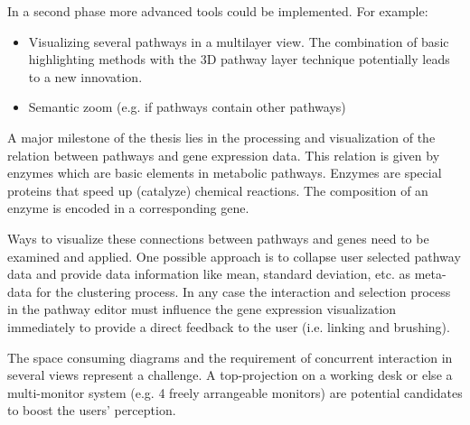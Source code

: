In a second phase more advanced tools could be implemented. 
For example:
\begin{itemize}
\item Visualizing several pathways in a multilayer view. The combination of basic highlighting methods with the 3D pathway layer technique potentially leads to a new innovation.
\item Semantic zoom (e.g. if pathways contain other pathways)
\end{itemize}


A major milestone of the thesis lies in the processing and visualization of the relation between pathways and gene expression data. This relation is given by enzymes which are basic elements in metabolic pathways. Enzymes are special proteins that speed up (catalyze) chemical reactions. The composition of an enzyme is encoded in a corresponding gene.

Ways to visualize these connections between pathways and genes need to be examined and applied. One possible approach is to collapse user selected pathway data and provide data information like mean, standard deviation, etc. as meta-data for the clustering process. In any case the interaction and selection process in the pathway editor must influence the gene expression visualization immediately to provide a direct feedback to the user (i.e. linking and brushing).


The space consuming diagrams and the requirement of concurrent interaction in several views represent a challenge. 
A top-projection on a working desk or else a multi-monitor system 
(e.g. 4 freely arrangeable monitors) are potential candidates to boost the users' perception. 
